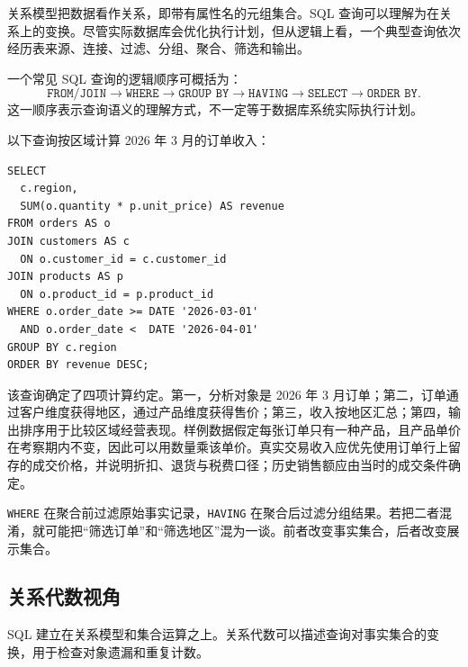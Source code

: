 关系模型把数据看作关系，即带有属性名的元组集合。SQL 查询可以理解为在关系上的变换。尽管实际数据库会优化执行计划，但从逻辑上看，一个典型查询依次经历表来源、连接、过滤、分组、聚合、筛选和输出。

\begin{definition}
一个常见 SQL 查询的逻辑顺序可概括为：
\[
\texttt{FROM/JOIN}
\rightarrow
\texttt{WHERE}
\rightarrow
\texttt{GROUP BY}
\rightarrow
\texttt{HAVING}
\rightarrow
\texttt{SELECT}
\rightarrow
\texttt{ORDER BY}.
\]
这一顺序表示查询语义的理解方式，不一定等于数据库系统实际执行计划。
\end{definition}

以下查询按区域计算 2026 年 3 月的订单收入：

\begin{lstlisting}[style=sqlstyle,caption={区域销售额查询}]
SELECT
  c.region,
  SUM(o.quantity * p.unit_price) AS revenue
FROM orders AS o
JOIN customers AS c
  ON o.customer_id = c.customer_id
JOIN products AS p
  ON o.product_id = p.product_id
WHERE o.order_date >= DATE '2026-03-01'
  AND o.order_date <  DATE '2026-04-01'
GROUP BY c.region
ORDER BY revenue DESC;
\end{lstlisting}

该查询确定了四项计算约定。第一，分析对象是 2026 年 3 月订单；第二，订单通过客户维度获得地区，通过产品维度获得售价；第三，收入按地区汇总；第四，输出排序用于比较区域经营表现。样例数据假定每张订单只有一种产品，且产品单价在考察期内不变，因此可以用数量乘该单价。真实交易收入应优先使用订单行上留存的成交价格，并说明折扣、退货与税费口径；历史销售额应由当时的成交条件确定。

\begin{remark}
\texttt{WHERE} 在聚合前过滤原始事实记录，\texttt{HAVING} 在聚合后过滤分组结果。若把二者混淆，就可能把“筛选订单”和“筛选地区”混为一谈。前者改变事实集合，后者改变展示集合。
\end{remark}

\subsection{关系代数视角}

SQL 建立在关系模型和集合运算之上。关系代数可以描述查询对事实集合的变换，用于检查对象遗漏和重复计数。

